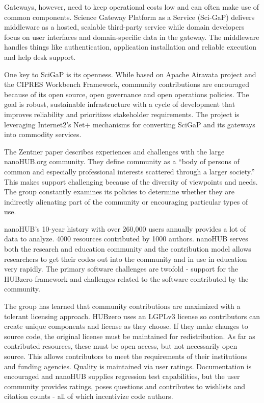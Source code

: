\documentclass[11pt, oneside]{amsart}
\begin{document}
Gateways, however, need to keep operational costs low and can often make use of common components. Science Gateway Platform as a Service (Sci-GaP)
delivers middleware as a hosted, scalable third-party service while domain developers focus on user interfaces and domain-specific data in the gateway.
The middleware handles things like authentication, application installation and reliable execution and help desk support.

One key to SciGaP is its openness. While based on Apache Airavata project and the CIPRES Workbench Framework, community contributions are encouraged because of its open source, open governance and open operations policies.
The goal is robust, sustainable infrastructure with a cycle of development that improves reliability and prioritizes
stakeholder requirements. The project is leveraging Internet2's Net+ mechanisms for converting SciGaP and its gateways into commodity services.

The Zentner paper describes experiences and challenges with the large nanoHUB.org community. They define community as 
a ``body of persons of common and especially professional interests scattered through a larger society.'' This makes support
challenging because of the diversity of viewpoints and needs. The group constantly examines its policies to determine
whether they are indirectly alienating part of the community or encouraging particular types of use.

nanoHUB's 10-year history with over 260,000 users annually provides a lot of data to analyze. 4000 resources contributed by
1000 authors. nanoHUB serves both the research and education community and the contribution model allows researchers to get
their codes out into the community and in use in education very rapidly. The primary software challenges are twofold - support
for the HUBzero framework and challenges related to the software contributed by the community.

The group has learned that community contributions are maximized with a tolerant licensing approach. HUBzero uses an 
LGPLv3 license so contributors can create unique components and license as they choose. If they make changes to source 
code, the original license must be maintained for redistribution. As far as contributed resources, these must be open access,
but not necessarily open source. This allows contributors to meet the requirements of their institutions and funding agencies.
Quality is maintained via user ratings. Documentation is encouraged and nanoHUB supplies regression test capabilities, but 
the user community provides ratings, poses questions and contributes to wishlists and citation counts - all of which incentivize
code authors.
\end{document}
